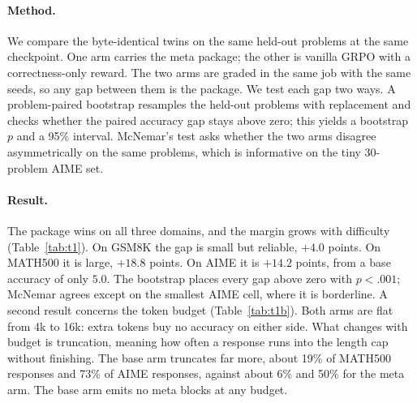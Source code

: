 \paragraph{Method.} We compare the byte-identical twins on the same held-out
problems at the same checkpoint. One arm carries the meta package; the other
is vanilla GRPO with a correctness-only reward. The two arms are graded in the
same job with the same seeds, so any gap between them is the package. We test
each gap two ways. A problem-paired bootstrap resamples the held-out problems
with replacement and checks whether the paired accuracy gap stays above zero;
this yields a bootstrap $p$ and a 95\% interval. McNemar's test asks whether
the two arms disagree asymmetrically on the same problems, which is
informative on the tiny 30-problem AIME set.

\paragraph{Result.} The package wins on all three domains, and the margin grows
with difficulty (Table~\ref{tab:t1}). On GSM8K the gap is small but reliable,
$+4.0$ points. On MATH500 it is large, $+18.8$ points. On AIME it is
$+14.2$ points, from a base accuracy of only $5.0$. The bootstrap places every
gap above zero with $p<.001$; McNemar agrees except on the smallest AIME cell,
where it is borderline. A second result concerns the token budget
(Table~\ref{tab:t1b}). Both arms are flat from 4k to 16k: extra tokens buy no
accuracy on either side. What changes with budget is truncation, meaning how
often a response runs into the length cap without finishing. The base arm
truncates far more, about 19\% of MATH500 responses and 73\% of AIME responses,
against about 6\% and 50\% for the meta arm. The base arm emits no meta blocks
at any budget.

